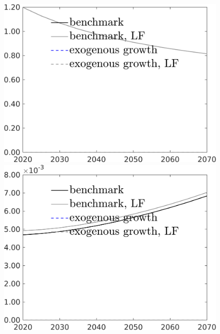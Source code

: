 \begin{figure}[h!!]
\begin{minipage}[]{0.32\textwidth}
 	\end{minipage}
 	\begin{minipage}[]{0.32\textwidth}
 		\includegraphics[width=1\textwidth]{../../codding_model/own_basedOnFried/optimalPol_190722_tidiedUp/figures/all_10Aout22/CountXgrTaulLF_target_sgsff_spillover0_sep1_extern0_PV1_etaa0.79_lgd1.png}
 	\end{minipage}
 	\begin{minipage}[]{0.32\textwidth}
 		\includegraphics[width=1\textwidth]{../../codding_model/own_basedOnFried/optimalPol_190722_tidiedUp/figures/all_10Aout22/CountXgrTaulLF_target_wsg_spillover0_sep1_extern0_PV1_etaa0.79_lgd1.png}

\end{minipage}
\end{figure}
